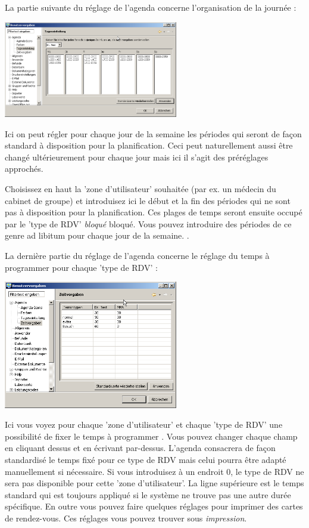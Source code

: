 La partie suivante du réglage de l'agenda concerne l'organisation de la journée :

\includegraphics[width=3in]{images/settings5.png}

Ici on peut régler pour chaque jour de la semaine les périodes qui seront de façon standard à disposition pour la planification. Ceci peut naturellement aussi être changé ultérieurement pour chaque jour mais ici il s'agit des préréglages approchés.

Choisissez en haut la 'zone d'utilisateur' souhaitée (par ex. un médecin du cabinet de groupe) et introduisez ici le début et la fin des périodes qui ne sont pas à disposition pour la planification. Ces plages de temps seront ensuite occupé par le 'type de RDV' \textit{bloqué} bloqué. Vous pouvez introduire des périodes de ce genre ad libitum pour chaque jour de la semaine.  .

La dernière partie du réglage de l'agenda concerne le réglage du temps à programmer pour chaque 'type de RDV' :

\includegraphics[width=3in]{images/settings6.png}

Ici vous voyez pour chaque 'zone d'utilisateur' et chaque 'type de RDV' une possibilité de fixer le temps à programmer . Vous pouvez changer chaque champ en cliquant dessus et en écrivant par-dessus. L'agenda consacrera de façon standardisé le temps fixé pour ce type de RDV mais celui pourra être adapté manuellement si nécessaire. Si vous introduisez à un endroit 0, le type de RDV ne sera pas disponible pour cette 'zone d'utilisateur'. La ligne supérieure est le temps standard qui est toujours appliqué si le système ne trouve pas une autre durée spécifique.
En outre vous pouvez faire quelques réglages pour imprimer des cartes de rendez-vous. Ces réglages vous pouvez trouver sous \textit{impression}.

